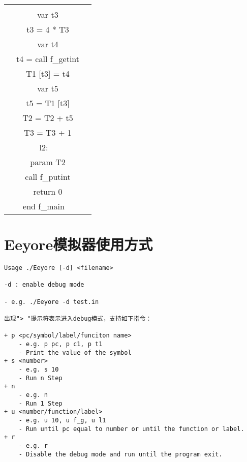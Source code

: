 \documentclass{ctexart}
\newenvironment{typewriterfont}{\ttfamily}{\par}
\begin{document}
\begin{table}[H]
\begin{typewriterfont}
\begin{tabular}{|c|c|}
{\ \ if t2 == 0 goto l2\\
\ \ var t3\\
\ \ t3 = 4 * T3\\
\ \ var t4\\
\ \ t4 = call f\_getint\\
\ \ T1 [t3] = t4\\
\ \ var t5\\
\ \ t5 = T1 [t3]\\
\ \ T2 = T2 + t5\\
\ \ T3 = T3 + 1\\
l2:\\
\ \ param T2\\
\ \ call f\_putint\\
\ \ return 0\\
end f\_main
} \\
        \hline
    \end{tabular}
    \end{typewriterfont}
\end{table}

\newpage
\section{Eeyore模拟器使用方式}
\begin{typewriterfont}
\begin{lstlisting}
Usage ./Eeyore [-d] <filename>

-d : enable debug mode

- e.g. ./Eeyore -d test.in

出现"> "提示符表示进入debug模式，支持如下指令： 

+ p <pc/symbol/label/funciton name>     
    - e.g. p pc, p c1, p t1
    - Print the value of the symbol
+ s <number>
    - e.g. s 10
    - Run n Step
+ n
    - e.g. n
    - Run 1 Step
+ u <number/function/label>
    - e.g. u 10, u f_g, u l1
    - Run until pc equal to number or until the function or label.
+ r
    - e.g. r
    - Disable the debug mode and run until the program exit.
\end{lstlisting}
\end{typewriterfont}
\end{document}

